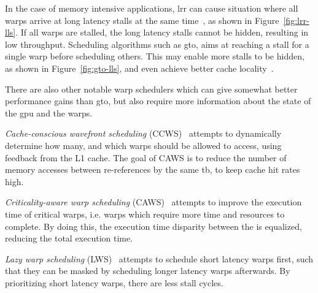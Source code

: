In the case of memory intensive applications, \acrshort{lrr} can cause situation where all warps arrive at long latency stalls at the same time~\cite{ZHANG2018520}, as shown in Figure~\ref{fig:lrr-lls}. If all warps are stalled, the long latency stalls cannot be hidden, resulting in low throughput. Scheduling algorithms such as \acrshort{gto}, aims at reaching a stall for a single warp before scheduling others. This may enable more stalls to be hidden, as shown in Figure~\ref{fig:gto-lls}, and even achieve better cache locality~\cite{cache-conscious_wavefront_scheduling, ZHANG2018520}.

There are also other notable warp schedulers which can give somewhat better performance gains than \acrshort{gto}, but also require more information about the state of the \acrshort{gpu} and the warps.

\textit{Cache-conscious wavefront scheduling} (CCWS)~\cite{cache-conscious_wavefront_scheduling} attempts to dynamically determine how many, and which warps should be allowed to access, using feedback from the L1 cache. The goal of CAWS is to reduce the number of memory accesses between re-references by the same \acrshort{tb}, to keep cache hit rates high.

\textit{Criticality-aware warp scheduling} (CAWS)~\cite{caws} attempts to improve the execution time of critical warps, i.e. warps which require more time and resources to complete. By doing this, the execution time disparity between the  is equalized, reducing the total execution time.

\textit{Lazy warp scheduling} (LWS)~\cite{improving_gpgpu_scheduling} attempts to schedule short latency warps first, such that they can be masked by scheduling longer latency warps afterwards. By prioritizing short latency warps, there are less stall cycles.

